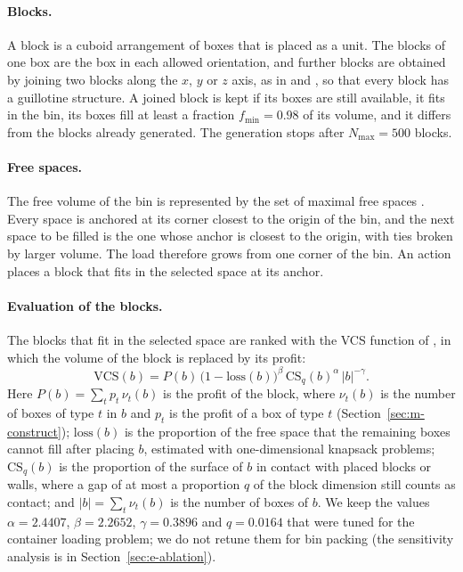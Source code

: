 \paragraph{Blocks.}
A block is a cuboid arrangement of boxes that is placed as a unit. The blocks of one box are the
box in each allowed orientation, and further blocks are obtained by joining two blocks along the
$x$, $y$ or $z$ axis, as in \citet{Fanslau2010} and \citet{Araya2014}, so that every block has a
guillotine structure.
A joined block is kept if its boxes are still available, it fits in the bin, its boxes fill at
least a fraction $f_{\min}=0.98$ of its volume, and it differs from the blocks already generated.
The generation stops after $N_{\max}=500$ blocks.

\paragraph{Free spaces.}
The free volume of the bin is represented by the set of maximal free spaces \citep{Parreno2008}.
Every space is anchored at its corner closest to the origin of the bin, and the next space to be
filled is the one whose anchor is closest to the origin, with ties broken by larger volume. The
load therefore grows from one corner of the bin. An action places a block that fits in the
selected space at its anchor.

\paragraph{Evaluation of the blocks.}
The blocks that fit in the selected space are ranked with the VCS function of \citet{Araya2017},
in which the volume of the block is replaced by its profit:
\begin{equation}
\label{eq:vcs}
\mathrm{VCS}(b) = P(b)\,\bigl(1-\mathrm{loss}(b)\bigr)^{\beta}\,\mathrm{CS}_q(b)^{\alpha}\,|b|^{-\gamma}.
\end{equation}
Here $P(b)=\sum_t p_t\,\nu_t(b)$ is the profit of the block, where $\nu_t(b)$ is the number of boxes
of type $t$ in $b$ and $p_t$ is the profit of a box of type $t$ (Section~\ref{sec:m-construct});
$\mathrm{loss}(b)$ is the proportion of the free space that the remaining boxes cannot fill
after placing $b$, estimated with one-dimensional knapsack problems; $\mathrm{CS}_q(b)$ is the
proportion of the surface of $b$ in contact with placed blocks or walls, where a gap of at most
a proportion $q$ of the block dimension still counts as contact; and $|b|=\sum_t\nu_t(b)$ is the number of boxes
of $b$. We keep the values $\alpha=2.4407$, $\beta=2.2652$, $\gamma=0.3896$ and $q=0.0164$ that
were tuned for the container loading problem; we do not retune them for bin packing
(the sensitivity analysis is in Section~\ref{sec:e-ablation}).

